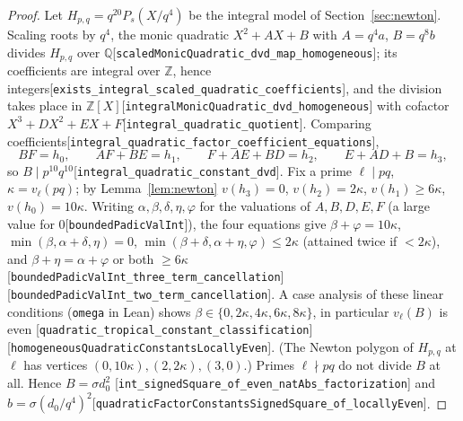 \documentclass[10pt]{article}
\theoremstyle{definition}
\theoremstyle{remark}
\newcommand{\Q}{\mathbb{Q}}
\newcommand{\Z}{\mathbb{Z}}
\newcommand{\leanref}[1]{{\scriptsize\textup{[\texttt{#1}]}}\allowbreak}
\begin{document}
\begin{proof}
Let $H_{p,q}=q^{20}P_s(X/q^4)$ be the integral model of Section~\ref{sec:newton}.
Scaling roots by $q^4$, the monic quadratic $X^2+AX+B$ with $A=q^4a$,
$B=q^8b$ divides $H_{p,q}$ over $\Q$\leanref{scaled\allowbreak Monic\allowbreak Quadratic\_\allowbreak dvd\_\allowbreak map\_\allowbreak homogeneous};
its coefficients are integral over $\Z$, hence
integers\leanref{exists\_\allowbreak integral\_\allowbreak scaled\_\allowbreak quadratic\_\allowbreak coefficients}, and the
division takes place in $\Z[X]$\leanref{integral\allowbreak Monic\allowbreak Quadratic\_\allowbreak dvd\_\allowbreak homogeneous}
with cofactor $X^3+DX^2+EX+F$\leanref{integral\_\allowbreak quadratic\_\allowbreak quotient}.  Comparing
coefficients\leanref{integral\_\allowbreak quadratic\_\allowbreak factor\_\allowbreak coefficient\_\allowbreak equations},
\[
 BF=h_0,\qquad AF+BE=h_1,\qquad F+AE+BD=h_2,\qquad E+AD+B=h_3 ,
\]
so $B\mid p^{10}q^{10}$\leanref{integral\_\allowbreak quadratic\_\allowbreak constant\_\allowbreak dvd}.  Fix a
prime $\ell\mid pq$, $\kappa=v_\ell(pq)$; by Lemma~\ref{lem:newton}
$v(h_3)=0$, $v(h_2)=2\kappa$, $v(h_1)\ge6\kappa$, $v(h_0)=10\kappa$.  Writing
$\alpha,\beta,\delta,\eta,\varphi$ for the valuations of $A,B,D,E,F$ (a large
value for $0$\leanref{bounded\allowbreak Padic\allowbreak Val\allowbreak Int}), the four equations give
$\beta+\varphi=10\kappa$, $\min(\beta,\alpha+\delta,\eta)=0$,
$\min(\beta+\delta,\alpha+\eta,\varphi)\le2\kappa$ (attained twice if $<2\kappa$),
and $\beta+\eta=\alpha+\varphi$ or both $\ge6\kappa$
\leanref{bounded\allowbreak Padic\allowbreak Val\allowbreak Int\_\allowbreak three\_\allowbreak term\_\allowbreak cancellation} \leanref{bounded\allowbreak Padic\allowbreak Val\allowbreak Int\_\allowbreak two\_\allowbreak term\_\allowbreak cancellation}.
A case analysis of these linear conditions (\texttt{omega} in Lean) shows
$\beta\in\{0,2\kappa,4\kappa,6\kappa,8\kappa\}$, in particular $v_\ell(B)$ is even
\leanref{quadratic\_\allowbreak tropical\_\allowbreak constant\_\allowbreak classification} \leanref{homogeneous\allowbreak Quadratic\allowbreak Constants\allowbreak Locally\allowbreak Even}.
(The Newton polygon of $H_{p,q}$ at $\ell$ has vertices
$(0,10\kappa),(2,2\kappa),(3,0)$.)  Primes $\ell\nmid pq$ do not divide
$B$ at all.  Hence $B=\sigma d_0^2$
\leanref{int\_\allowbreak signed\allowbreak Square\_\allowbreak of\_\allowbreak even\_\allowbreak nat\allowbreak Abs\_\allowbreak factorization} and
$b=\sigma(d_0/q^4)^2$\leanref{quadratic\allowbreak Factor\allowbreak Constants\allowbreak Signed\allowbreak Square\_\allowbreak of\_\allowbreak locally\allowbreak Even}.
\end{proof}
\end{document}
